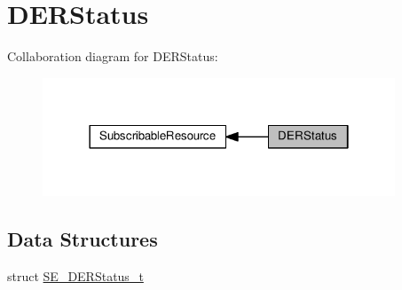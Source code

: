 \hypertarget{group__DERStatus}{}\section{D\+E\+R\+Status}
\label{group__DERStatus}
Collaboration diagram for D\+E\+R\+Status\+:\nopagebreak
\begin{figure}[H]
\begin{center}
\leavevmode
\includegraphics[width=298pt]{group__DERStatus}
\end{center}
\end{figure}
\subsection*{Data Structures}
\begin{DoxyCompactItemize}
\item 
struct \hyperlink{structSE__DERStatus__t}{S\+E\+\_\+\+D\+E\+R\+Status\+\_\+t}
\end{DoxyCompactItemize}
